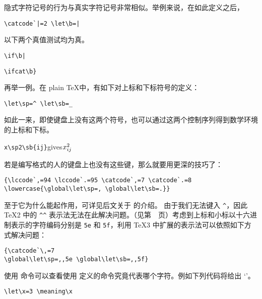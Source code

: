 \documentclass{book}
\begin{document}
隐式字符记号的行为与真实字符记号非常相似。举例来说，在如此定义之后，
\begin{verbatim}
\catcode`|=2 \let\b=|
\end{verbatim}
以下两个真值测试均为真。
\begin{verbatim}
\if\b|
\end{verbatim}
\begin{verbatim}
\ifcat\b}
\end{verbatim}

再举一例。在 plain \TeX 中，有如下对上标和下标符号的定义：
\begin{verbatim}
\let\sp=^ \let\sb=_
\end{verbatim}
如此一来，即使键盘上没有这两个符号，也可以通过这两个控制序列得到数学环境的上标和下标。
\begin{disp}\verb>x\sp2\sb{ij}>\quad gives\quad $x\sp2\sb{ij}$\end{disp}
若是编写格式的人的键盘上也没有这些键，那么就要用更深的技巧了：\label{spsb:truc}
\begin{verbatim}
{\lccode`,=94 \lccode`.=95 \catcode`,=7 \catcode`.=8
\lowercase{\global\let\sp=, \global\let\sb=.}}
\end{verbatim}
至于它为什么能起作用，可详见后文关于  的介绍。
由于我们无法键入 \verb.^.，因此 \TeX2 中的 \verb.^^. 表示法无法在此解决问题。（见第~\pageref{hathat}~页）考虑到上标和小标以十六进制表示的字符编码分别是 \verb.5e. 和 \verb.5f.，利用 \TeX3 中扩展的表示法可以依照如下方式解决问题：
\begin{verbatim}
{\catcode`\,=7
\global\let\sp=,,5e \global\let\sb=,,5f}
\end{verbatim}

使用  命令可以查看使用  定义的命令究竟代表哪个字符。例如下列代码将给出 `'。
\begin{verbatim}
\let\x=3 \meaning\x
\end{verbatim}
\end{document}
